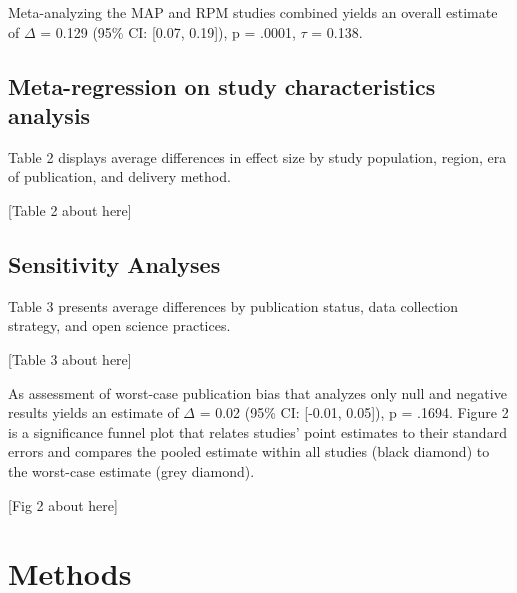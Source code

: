 \documentclass[sn-nature,referee,pdflatex]{sn-jnl}
\begin{document}
Meta-analyzing the MAP and RPM studies combined yields an overall
estimate of \(\Delta\) = 0.129 (95\% CI: {[}0.07, 0.19{]}), p = .0001,
\(\tau\) = 0.138.

\subsection{Meta-regression on study characteristics
analysis}\label{sec2.4}

Table 2 displays average differences in effect size by study population,
region, era of publication, and delivery method.

\begin{center}
[Table 2 about here]
\end{center}

\subsection{Sensitivity Analyses}\label{sec2.5}

Table 3 presents average differences by publication status, data
collection strategy, and open science practices.

\begin{center}
[Table 3 about here]
\end{center}

\begin{comment}
The meta-analytic mean corrected for publication bias [@hedges1992], which assumes that significant, positive results are twice as likely to be published as anything else, is $\Delta$ = r pub_bias_estimate (95%
\end{comment}

As assessment of worst-case publication bias that analyzes only null and
negative results \citep{mathur2024} yields an estimate of \(\Delta\) =
0.02 (95\% CI: {[}-0.01, 0.05{]}), p = .1694. Figure 2 is a significance
funnel plot \citep{mathur2020} that relates studies' point estimates to
their standard errors and compares the pooled estimate within all
studies (black diamond) to the worst-case estimate (grey diamond).

\begin{center}
[Fig 2 about here]
\end{center}
\begin{comment}
should this be a supplementary fig?
\end{comment}

\section{Methods}\label{sec3}
\end{document}
